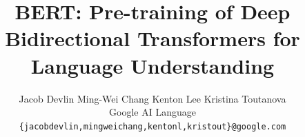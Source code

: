\newcommand\BibTeX{B{\sc ib}\TeX}
\newcommand\bert{BERT\xspace}
\newcommand{\eat}[1]{\ignorespaces}




\setlength{\tabcolsep}{0.3em}


\newcommand\bertbase{BERT$_{\small \textsc{BASE}}$\xspace}
\newcommand\bertlarge{BERT$_{\small \textsc{LARGE}}$\xspace}

\title{\textbf{BERT}: Pre-training of Deep Bidirectional Transformers for \\ Language Understanding}

\author{Jacob Devlin \quad Ming-Wei Chang \quad Kenton Lee \quad Kristina Toutanova \\
  Google AI Language \\
  {\tt \{jacobdevlin,mingweichang,kentonl,kristout\}@google.com} \\}

\date{}

\aclfinalcopy %
\def\aclpaperid{1584} %



\maketitle
\begin{abstract}
  
\end{abstract}
















{} 
\appendix                                     






